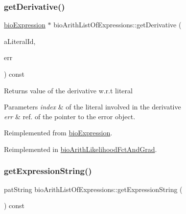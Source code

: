 \mbox{\label{classbio_arith_list_of_expressions_a14fe977b86bc69c4b3afe59d44b6c03f}} 
\subsubsection{\texorpdfstring{get\+Derivative()}{getDerivative()}}
{\footnotesize\ttfamily \hyperlink{classbio_expression}{bio\+Expression} $\ast$ bio\+Arith\+List\+Of\+Expressions\+::get\+Derivative (\begin{DoxyParamCaption}\item[{pat\+U\+Long}]{a\+Literal\+Id,  }\item[{pat\+Error $\ast$\&}]{err }\end{DoxyParamCaption}) const\hspace{0.3cm}{\ttfamily [virtual]}}

\begin{DoxyReturn}{Returns}
value of the derivative w.\+r.\+t literal 
\end{DoxyReturn}

\begin{DoxyParams}{Parameters}
{\em index} & of the literal involved in the derivative \\
\hline
{\em err} & ref. of the pointer to the error object. \\
\hline
\end{DoxyParams}


Reimplemented from \hyperlink{classbio_expression_a5915579d1193f25f216c1e273c97f2ce}{bio\+Expression}.



Reimplemented in \hyperlink{classbio_arith_likelihood_fct_and_grad_ab814e1cc11e481c88ba1d7401432c706}{bio\+Arith\+Likelihood\+Fct\+And\+Grad}.

\mbox{\label{classbio_arith_list_of_expressions_ac6a8b9493bc91520a1882df3cddc383d}} 
\subsubsection{\texorpdfstring{get\+Expression\+String()}{getExpressionString()}}
{\footnotesize\ttfamily pat\+String bio\+Arith\+List\+Of\+Expressions\+::get\+Expression\+String (\begin{DoxyParamCaption}{ }\end{DoxyParamCaption}) const\hspace{0.3cm}{\ttfamily [virtual]}}

